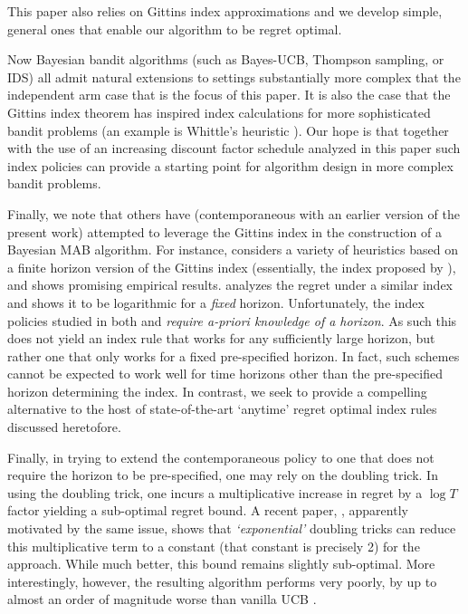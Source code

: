 This paper also relies on Gittins index approximations and we develop simple, general ones that enable our algorithm to be regret optimal. 

{
Now Bayesian bandit algorithms (such as Bayes-UCB, Thompson sampling, or IDS) all admit natural extensions to settings substantially more complex that the independent arm case that is the focus of this paper. It is also the case that the Gittins index theorem has inspired index calculations for more sophisticated bandit problems (an example is Whittle's heuristic  \citep{whittle1988restless}). Our hope is that together with the use of an increasing discount factor schedule analyzed in this paper such index policies can provide a starting point for algorithm design in more complex bandit problems. 
}

Finally, we note that others have (contemporaneous with an earlier version of the present work) attempted to leverage the Gittins index in the construction of a Bayesian MAB algorithm. For instance, \cite{kaufmann2016bayesian} considers a variety of heuristics based on a finite horizon version of the Gittins index (essentially, the index proposed by \cite{bradt1956sequential}), and shows promising empirical results. \cite{lattimore2016bayesregret} analyzes the regret under a similar index and shows it to be logarithmic for a {\em fixed} horizon. Unfortunately, the index policies studied in both \citep{kaufmann2016bayesian} and \citep{lattimore2016bayesregret} {\em require a-priori knowledge of a horizon}. As such this does not yield an index rule that works for any sufficiently large horizon, but rather one that only works for a fixed pre-specified horizon. In fact, such schemes cannot be expected to work well for time horizons other than the pre-specified horizon determining the index. In contrast, we seek to provide a compelling alternative to the host of state-of-the-art `anytime' regret optimal index rules discussed heretofore. 

{Finally, in trying to extend the contemporaneous \cite{lattimore2016bayesregret} policy to one that does not require the horizon to be pre-specified, one may rely on the doubling trick. In using the doubling trick, one incurs a multiplicative increase in regret by a $\log T$ factor yielding a sub-optimal regret bound. A recent paper, \citep{besson2018doubling}, apparently motivated by the same issue, shows that {\em `exponential'} doubling tricks can reduce this multiplicative term to a constant (that constant is precisely 2) for the \cite{lattimore2016bayesregret} approach. While much better, this bound remains slightly sub-optimal. More interestingly, however, the resulting algorithm performs very poorly, by up to almost an order of magnitude worse than vanilla UCB \citep{besson2018doubling}.}



